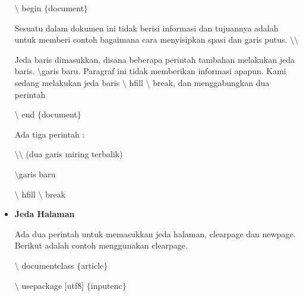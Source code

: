 \begin{itemize}
\hspace*{0.5in}$\setminus$ begin $ \{ $document$ \} $\par
\vspace{\baselineskip}
Sesuatu dalam dokumen ini tidak berisi informasi dan tujuannya adalah untuk memberi contoh bagaimana cara menyisipkan spasi dan garis putus. $\setminus$$\setminus$\par
\vspace{\baselineskip}
Jeda baris dimasukkan, disana beberapa perintah tambahan melakukan jeda baris. $\setminus$garis baru. Paragraf ini tidak memberikan informasi apapun. Kami sedang melakukan jeda baris $\setminus$ hfill $\setminus$ break, dan menggabungkan dua perintah\par

\hspace*{0.5in}$\setminus$ end $ \{ $document$ \} $\par

Ada tiga perintah :\par

\hspace*{0.5in}$\setminus$$\setminus$ (dua garis miring terbalik)\par

\hspace*{0.5in}$\setminus$garis baru\par

\hspace*{0.5in}$\setminus$ hfill $\setminus$ break\par
\vspace{\baselineskip}
\vspace{10pt}
	\item {\fontsize{14pt}{14pt}\selectfont \textbf{Jeda Halaman}}\par
\vspace{\baselineskip}
Ada dua perintah untuk memasukkan jeda halaman, clearpage dan newpage. Berikut adalah contoh menggunakan clearpage.\par
\vspace{\baselineskip}
\hspace*{0.5in}$\setminus$ documentclass $ \{ $article$ \} $\par

\hspace*{0.5in}$\setminus$ usepackage [utf8] $ \{ $inputenc$ \} $\par


\end{itemize}
